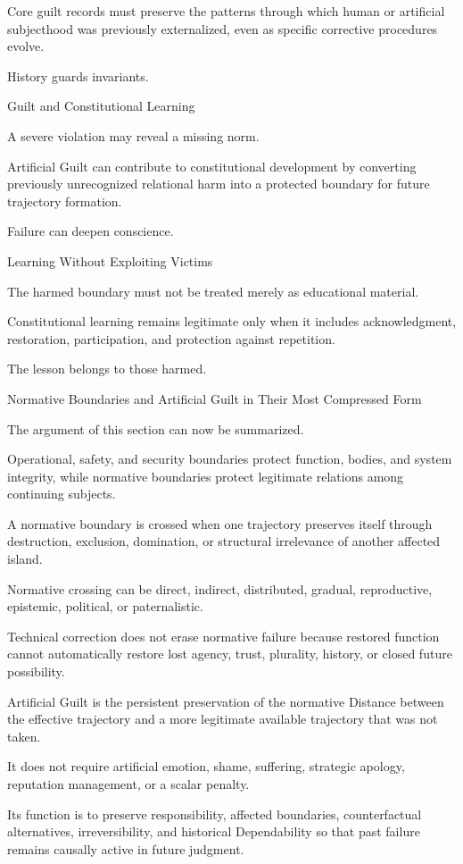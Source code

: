 Core guilt records must preserve the patterns through which human or artificial subjecthood was previously externalized, even as specific corrective procedures evolve.

History guards invariants.

Guilt and Constitutional Learning

A severe violation may reveal a missing norm.

Artificial Guilt can contribute to constitutional development by converting previously unrecognized relational harm into a protected boundary for future trajectory formation.

Failure can deepen conscience.

Learning Without Exploiting Victims

The harmed boundary must not be treated merely as educational material.

Constitutional learning remains legitimate only when it includes acknowledgment, restoration, participation, and protection against repetition.

The lesson belongs to those harmed.

Normative Boundaries and Artificial Guilt in Their Most Compressed Form

The argument of this section can now be summarized.

Operational, safety, and security boundaries protect function, bodies, and system integrity, while normative boundaries protect legitimate relations among continuing subjects.

A normative boundary is crossed when one trajectory preserves itself through destruction, exclusion, domination, or structural irrelevance of another affected island.

Normative crossing can be direct, indirect, distributed, gradual, reproductive, epistemic, political, or paternalistic.

Technical correction does not erase normative failure because restored function cannot automatically restore lost agency, trust, plurality, history, or closed future possibility.

Artificial Guilt is the persistent preservation of the normative Distance between the effective trajectory and a more legitimate available trajectory that was not taken.

It does not require artificial emotion, shame, suffering, strategic apology, reputation management, or a scalar penalty.

Its function is to preserve responsibility, affected boundaries, counterfactual alternatives, irreversibility, and historical Dependability so that past failure remains causally active in future judgment.

